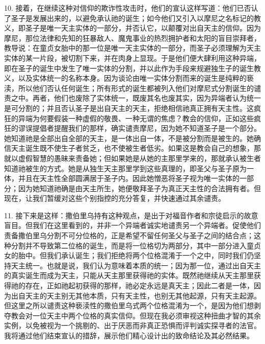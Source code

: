 10. 接着，在继续这种对信仰的欺诈性攻击时，他们的宣认这样写道：他们已否认了圣子是发展出来的，以避免承认祂的诞生；如今他们又引入以摩尼之名标记的教义，即圣子是唯一天主实体的一部分，并否认它，以颠覆对出自天主的信仰。因为摩尼，那位法律和先知的狂暴敌人、魔鬼事业的热烈拥护者和太阳的盲目崇拜者，教导说：在童贞女胎中的那一位是唯一天主实体的一部分，而圣子必须理解为天主实体的某一片段，被切割下来，并在肉身上显现。于是他们便大肆利用这种异端，即在圣子的诞生中发生了唯一实体的分割，并以此作为手段来规避独生子的诞生教义，以及实体统一的名称本身。因为谈论由唯一实体分割而来的诞生是纯粹的亵渎，所以他们否认任何诞生；所有形式的诞生都被列入他们对摩尼式分割诞生的谴责之中。再者，他们也废除了实体统一，既废其名也废其实，因为异端者认为统一是可分割的；并且否认圣子是出自天主的天主，拒绝相信祂真正拥有天主性。这疯狂的异端为何要假装一种虚假的敬畏、一种无谓的焦虑？教会的信仰，正如这些疯狂的谬误提倡者提醒我们的那样，确实谴责摩尼，因为她不知道圣子是一个部分。她知道祂是全部出自全部的天主，是一体出自一体，不是被分割而是被生的。她确信天主诞生既不使生子者贫乏，也不使被生者低劣。如果这是教会自己的想象，那就以虚假智慧的愚昧来责备她；但如果她是从她的主那里学来的，那就承认被生者知道祂被生的方式。她是从独生天主那里学到这些真理的，即圣父与圣子原为一体，并且在天主性全部圆满居于圣子内。因此她憎恶将圣子视为唯一实体的一部分；因为她知道祂确是由天主所生，她便敬拜圣子为真正天主性的合法拥有者。但现在，让我们暂缓对这些个别指控的充分答复，并快速通过其余谴责。\par

11. 接下来是这样：撒伯里乌持有这种观点，是出于对福音作者和宗徒启示的故意盲目。但我们在这里看到的，并非一个异端者诚实地谴责另一个异端者。促使他们责备撒伯里乌分割不可分位格的，正是希望不留任何圣父与圣子之间的结合点；这种分割并不导致第二位格的诞生，而是将一位格切为两部分，其中一部分进入童贞女的胎中。但我们承认诞生；我们拒绝将两个位格混淆于一个之中，同时我们仍坚持天主统一。也就是说，我们认为意味着本质的统一；因为那一位，通过出自天主的真实诞生而成为天主，只能从天主那里获得祂的实体。既然祂继续从天主那里获得祂的存在，正如祂起初获得的那样，祂必定永远是真天主；因此二者是一体，因为出自天主的天主别无其他本质，只有天主性，也别无其他起源，只有天主起源。但这里之所以谴责这种亵渎性的撒伯里乌式两个位格混淆为一个，是因为他们想剥夺教会对一位天主中两个位格的真实信仰。但现在我必须审视这种扭曲才智的其余实例，以免被视为一个挑剔的、出于厌恶而非真正恐惧而评判诚实探寻者的法官。我将通过他们结束宣认的措辞，展示他们精心设计出的致命结论及其必然结果。\par

